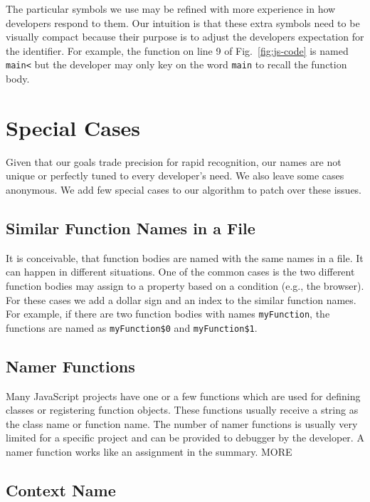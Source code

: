 \documentclass[10pt, preprint]{sigplanconf}
\begin{document}
The particular symbols we use may be refined with more experience in how developers respond to them. Our intuition is that these extra symbols need to be visually compact because their purpose is to adjust the developers expectation for the identifier. For example, the function on line 9 of Fig.~\ref{fig:js-code} is named \texttt{main<} but the developer may only key on the word \texttt{main} to recall the function body. 

\section{Special Cases}
Given that our goals trade precision for rapid recognition, our names are not unique or perfectly tuned to every developer's need. We also leave some cases anonymous. We add  few special cases to our algorithm to patch over these issues.

\subsection{Similar Function Names in a File}
It is conceivable, that function bodies are named with the same names in a file. It can happen in different situations. One of the common cases is the two different function bodies may assign to a property based on a condition (e.g., the browser). For these cases we add a dollar sign and an index to the similar function names. For example, if there are two function bodies with names {\small\texttt{myFunction}}, the functions are named as {\small\texttt{myFunction\$0}} and {\small\texttt{myFunction\$1}}. 

\subsection{Namer Functions}
Many JavaScript projects have one or a few functions which are used for defining classes or registering function objects. These functions usually receive a string as the class name or function name. The number of namer functions is usually very limited for a specific project and can be provided to debugger by the developer. A namer function works like an assignment in the summary.  MORE




\subsection{Context Name}
\end{document}
